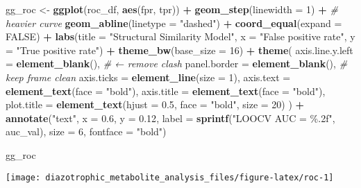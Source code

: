 \documentclass[
]{article}
\newenvironment{Shaded}{\begin{snugshade}}{\end{snugshade}}
\newcommand{\AttributeTok}[1]{\textcolor[rgb]{0.13,0.29,0.53}{#1}}
\newcommand{\CommentTok}[1]{\textcolor[rgb]{0.56,0.35,0.01}{\textit{#1}}}
\newcommand{\ConstantTok}[1]{\textcolor[rgb]{0.56,0.35,0.01}{#1}}
\newcommand{\DecValTok}[1]{\textcolor[rgb]{0.00,0.00,0.81}{#1}}
\newcommand{\FloatTok}[1]{\textcolor[rgb]{0.00,0.00,0.81}{#1}}
\newcommand{\FunctionTok}[1]{\textcolor[rgb]{0.13,0.29,0.53}{\textbf{#1}}}
\newcommand{\NormalTok}[1]{#1}
\newcommand{\OtherTok}[1]{\textcolor[rgb]{0.56,0.35,0.01}{#1}}
\newcommand{\SpecialCharTok}[1]{\textcolor[rgb]{0.81,0.36,0.00}{\textbf{#1}}}
\newcommand{\StringTok}[1]{\textcolor[rgb]{0.31,0.60,0.02}{#1}}
\begin{document}
\begin{Shaded}
\begin{Highlighting}[]
\NormalTok{gg\_roc }\OtherTok{\textless{}{-}} \FunctionTok{ggplot}\NormalTok{(roc\_df, }\FunctionTok{aes}\NormalTok{(fpr, tpr)) }\SpecialCharTok{+}
  \FunctionTok{geom\_step}\NormalTok{(}\AttributeTok{linewidth =} \DecValTok{1}\NormalTok{) }\SpecialCharTok{+}                          \CommentTok{\# heavier curve}
  \FunctionTok{geom\_abline}\NormalTok{(}\AttributeTok{linetype =} \StringTok{"dashed"}\NormalTok{) }\SpecialCharTok{+}
  \FunctionTok{coord\_equal}\NormalTok{(}\AttributeTok{expand =} \ConstantTok{FALSE}\NormalTok{) }\SpecialCharTok{+}
  \FunctionTok{labs}\NormalTok{(}\AttributeTok{title =} \StringTok{"Structural Similarity Model"}\NormalTok{,}
       \AttributeTok{x =} \StringTok{"False positive rate"}\NormalTok{,}
       \AttributeTok{y =} \StringTok{"True positive rate"}\NormalTok{) }\SpecialCharTok{+}
  \FunctionTok{theme\_bw}\NormalTok{(}\AttributeTok{base\_size =} \DecValTok{16}\NormalTok{) }\SpecialCharTok{+}
  \FunctionTok{theme}\NormalTok{(}
    \AttributeTok{axis.line.y.left =} \FunctionTok{element\_blank}\NormalTok{(),               }\CommentTok{\# ← remove clash}
    \AttributeTok{panel.border     =} \FunctionTok{element\_blank}\NormalTok{(),               }\CommentTok{\# keep frame clean}
    \AttributeTok{axis.ticks       =} \FunctionTok{element\_line}\NormalTok{(}\AttributeTok{size =} \DecValTok{1}\NormalTok{),}
    \AttributeTok{axis.text        =} \FunctionTok{element\_text}\NormalTok{(}\AttributeTok{face =} \StringTok{"bold"}\NormalTok{),}
    \AttributeTok{axis.title       =} \FunctionTok{element\_text}\NormalTok{(}\AttributeTok{face =} \StringTok{"bold"}\NormalTok{),}
    \AttributeTok{plot.title       =} \FunctionTok{element\_text}\NormalTok{(}\AttributeTok{hjust =} \FloatTok{0.5}\NormalTok{,}
                                    \AttributeTok{face =} \StringTok{"bold"}\NormalTok{,}
                                    \AttributeTok{size =} \DecValTok{20}\NormalTok{)}
\NormalTok{  ) }\SpecialCharTok{+}
  \FunctionTok{annotate}\NormalTok{(}\StringTok{"text"}\NormalTok{, }\AttributeTok{x =} \FloatTok{0.6}\NormalTok{, }\AttributeTok{y =} \FloatTok{0.12}\NormalTok{,}
           \AttributeTok{label =} \FunctionTok{sprintf}\NormalTok{(}\StringTok{"LOOCV AUC = \%.2f"}\NormalTok{, auc\_val),}
           \AttributeTok{size =} \DecValTok{6}\NormalTok{, }\AttributeTok{fontface =} \StringTok{"bold"}\NormalTok{)}


\NormalTok{gg\_roc}
\end{Highlighting}
\end{Shaded}

\texttt{[image: diazotrophic\_metabolite\_analysis\_files/figure-latex/roc-1]}
\end{document}
